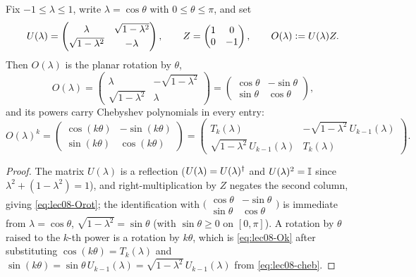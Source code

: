 \begin{lemma}
\label{lem:lec08-rot}
Fix $-1\le\lambda\le1$, write $\lambda=\cos\theta$ with $0\le\theta\le\pi$, and set
\begin{equation}
  U(\lambda)=\begin{pmatrix}\lambda&\sqrt{1-\lambda^2}\\[2pt]
    \sqrt{1-\lambda^2}&-\lambda\end{pmatrix},\qquad
  Z=\begin{pmatrix}1&0\\0&-1\end{pmatrix},\qquad
  O(\lambda)\vcentcolon= U(\lambda)Z.
  \label{eq:lec08-Odef}
\end{equation}
Then $O(\lambda)$ is the planar rotation by $\theta$,
\begin{equation}
  O(\lambda)=\begin{pmatrix}\lambda&-\sqrt{1-\lambda^2}\\[2pt]
    \sqrt{1-\lambda^2}&\lambda\end{pmatrix}
  =\begin{pmatrix}\cos\theta&-\sin\theta\\ \sin\theta&\cos\theta\end{pmatrix},
  \label{eq:lec08-Orot}
\end{equation}
and its powers carry Chebyshev polynomials in every entry:
\begin{equation}
  O(\lambda)^k
  =\begin{pmatrix}\cos(k\theta)&-\sin(k\theta)\\ \sin(k\theta)&\cos(k\theta)\end{pmatrix}
  =\begin{pmatrix}T_k(\lambda)&-\sqrt{1-\lambda^2}\,U_{k-1}(\lambda)\\[2pt]
    \sqrt{1-\lambda^2}\,U_{k-1}(\lambda)&T_k(\lambda)\end{pmatrix}.
  \label{eq:lec08-Ok}
\end{equation}
\end{lemma}

\begin{proof}
The matrix $U(\lambda)$ is a reflection ($U(\lambda)=U(\lambda)^{\dagger}$ and
$U(\lambda)^2=\mathbb{I}$ since $\lambda^2+(1-\lambda^2)=1$), and right-multiplication by
$Z$ negates the second column, giving \eqref{eq:lec08-Orot}; the identification with
$\bigl(\begin{smallmatrix}\cos\theta&-\sin\theta\\ \sin\theta&\cos\theta
\end{smallmatrix}\bigr)$ is immediate from $\lambda=\cos\theta$,
$\sqrt{1-\lambda^2}=\sin\theta$ (with $\sin\theta\ge0$ on $[0,\pi]$). A rotation by
$\theta$ raised to the $k$-th power is a rotation by $k\theta$, which is
\eqref{eq:lec08-Ok} after substituting $\cos(k\theta)=T_k(\lambda)$ and
$\sin(k\theta)=\sin\theta\,U_{k-1}(\lambda)=\sqrt{1-\lambda^2}\,U_{k-1}(\lambda)$
from \eqref{eq:lec08-cheb}.
\end{proof}


